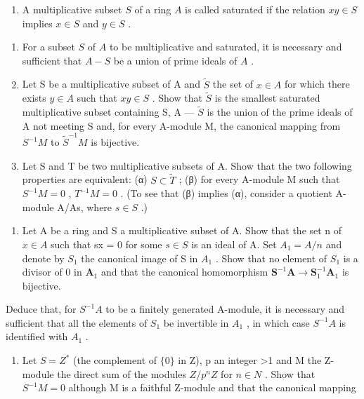 
\begin{enumerate}
\def\labelenumi{\arabic{enumi}.}
\tightlist
\item
  A multiplicative subset \(S\) of a ring \(A\) is called saturated if the relation \(xy \in S\) implies \(x \in S\) and \(y \in S\) .
\end{enumerate}

\begin{enumerate}
\def\labelenumi{(\alph{enumi})}
\item
  For a subset \(S\) of \(A\) to be multiplicative and saturated, it is necessary and sufficient that \(A - S\) be a union of prime ideals of \(A\) .
\item
  Let S be a multiplicative subset of A and \(\tilde{S}\) the set of \(x \in A\) for which there exists \(y \in A\) such that \(xy \in S\) . Show that \(\tilde{S}\) is the smallest saturated multiplicative subset containing S, A --- \(\tilde{S}\) is the union of the prime ideals of A not meeting S and, for every A-module M, the canonical mapping from \(S^{-1}M\) to \(\tilde{S}^{-1}M\) is bijective.
\item
  Let S and T be two multiplicative subsets of A. Show that the two following properties are equivalent: (α) \(S \subset \tilde{T}\) ; (β) for every A-module M such that \(S^{-1}M = 0\) , \(T^{-1}M = 0\) . (To see that (β) implies (α), consider a quotient A-module A/As, where \(s \in S\) .)
\end{enumerate}

\begin{enumerate}
\def\labelenumi{\arabic{enumi}.}
\setcounter{enumi}{1}
\tightlist
\item
  Let A be a ring and S a multiplicative subset of A. Show that the set n of \(x \in A\) such that sx = 0 for some \(s \in S\) is an ideal of A. Set \(A_{1} = A/n\) and denote by \(S_{1}\) the canonical image of S in \(A_{1}\) . Show that no element of \(S_{1}\) is a divisor of 0 in \(\mathbf{A}_1\) and that the canonical homomorphism \(\mathbf{S}^{-1}\mathbf{A} \to \mathbf{S}_1^{-1}\mathbf{A}_1\) is bijective.
\end{enumerate}

Deduce that, for \(S^{-1}A\) to be a finitely generated A-module, it is necessary and sufficient that all the elements of \(S_{1}\) be invertible in \(A_{1}\) , in which case \(S^{-1}A\) is identified with \(A_{1}\) .

\begin{enumerate}
\def\labelenumi{\arabic{enumi}.}
\setcounter{enumi}{2}
\tightlist
\item
  Let \(S = Z^{*}\) (the complement of \(\{0\}\) in Z), p an integer \textgreater1 and M the Z-module the direct sum of the modules \(Z/p^{n}Z\) for \(n \in N\) . Show that \(S^{-1}M = 0\) although M is a faithful Z-module and that the canonical mapping
\end{enumerate}

